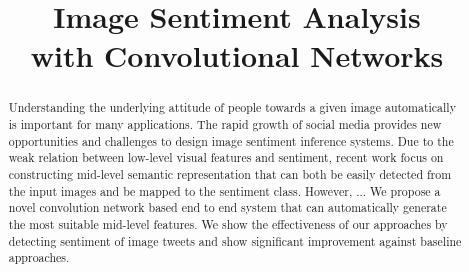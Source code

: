 \documentclass[a4paper,conference]{IEEEtran}
\begin{document}
%
\title{Image Sentiment Analysis\\ with Convolutional Networks}


\author{
}

\maketitle

\begin{abstract}
Understanding the underlying attitude of people towards a given image automatically is important for many applications. The rapid growth of social media provides new opportunities and challenges to design image sentiment inference systems. Due to the weak relation between low-level visual features and sentiment, recent work focus on constructing mid-level semantic representation that can both be easily detected from the input images and be mapped to the sentiment class. However, ... We propose a novel convolution network based end to end system that can automatically generate the most suitable mid-level features. We show the effectiveness of our approaches by detecting sentiment of image tweets and show significant improvement against baseline approaches.
\end{abstract}

\IEEEpeerreviewmaketitle














\end{document}
